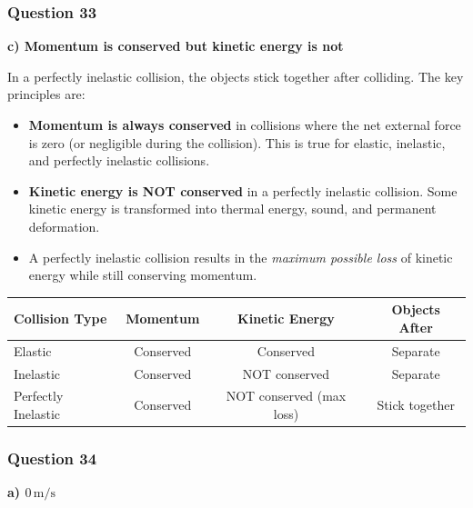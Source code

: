 \documentclass[12pt,letterpaper]{article}
\begin{document}
\subsubsection*{Question 33}

\begin{answerbox}
\textbf{c) Momentum is conserved but kinetic energy is not}
\end{answerbox}

\begin{explanationbox}
In a perfectly inelastic collision, the objects stick together after colliding. The key principles are:

\begin{itemize}
\item \textbf{Momentum is always conserved} in collisions where the net external force is zero (or negligible during the collision). This is true for elastic, inelastic, and perfectly inelastic collisions.
\item \textbf{Kinetic energy is NOT conserved} in a perfectly inelastic collision. Some kinetic energy is transformed into thermal energy, sound, and permanent deformation.
\item A perfectly inelastic collision results in the \emph{maximum possible loss} of kinetic energy while still conserving momentum.
\end{itemize}

\begin{center}
\begin{tabular}{lccc}
\toprule
\textbf{Collision Type} & \textbf{Momentum} & \textbf{Kinetic Energy} & \textbf{Objects After} \\
\midrule
Elastic & Conserved & Conserved & Separate \\
Inelastic & Conserved & NOT conserved & Separate \\
Perfectly Inelastic & Conserved & NOT conserved (max loss) & Stick together \\
\bottomrule
\end{tabular}
\end{center}
\end{explanationbox}

\subsubsection*{Question 34}

\begin{answerbox}
\textbf{a) $0\,\text{m/s}$}
\end{answerbox}
\end{document}
